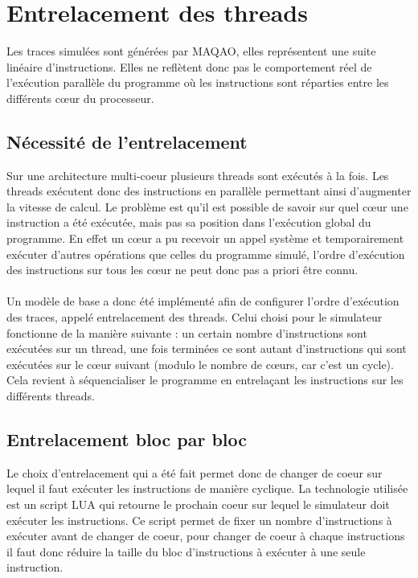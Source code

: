 \section{Entrelacement des threads}

Les traces simulées sont générées par \textsf{MAQAO}, elles représentent une suite linéaire d'instructions. Elles ne reflètent donc pas le comportement réel de l'exécution parallèle du programme où les instructions sont réparties entre les différents c\oe ur du processeur. 

\subsection{Nécessité de l'entrelacement}

Sur une architecture multi-coeur plusieurs threads sont exécutés à la fois. Les threads exécutent donc des instructions en parallèle permettant ainsi d'augmenter la vitesse de calcul. Le problème est qu'il est possible de savoir sur quel c\oe ur une instruction a été exécutée, mais pas sa position dans l'exécution global du programme. En effet un c\oe ur a pu recevoir un appel système et temporairement exécuter d'autres opérations que celles du programme simulé, l'ordre d'exécution des instructions sur tous les c\oe ur ne peut donc pas a priori être connu. 

\paragraph{}
Un modèle de base a donc été implémenté afin de configurer l'ordre d'exécution des traces, appelé entrelacement des threads. Celui choisi pour le simulateur fonctionne de la manière suivante : un certain nombre d'instructions sont exécutées sur un thread, une fois terminées ce sont autant d'instructions qui sont exécutées sur le c\oe ur suivant (modulo le nombre de c\oe urs, car c'est un cycle). Cela revient à séquencialiser le programme en entrelaçant les instructions sur les différents threads.

\subsection{Entrelacement bloc par bloc}

Le choix d'entrelacement qui a été fait permet donc de changer de coeur sur lequel il faut exécuter les instructions de manière cyclique. La technologie utilisée est un script LUA qui retourne le prochain coeur sur lequel le simulateur doit exécuter les instructions. Ce script permet de fixer un nombre d'instructions à exécuter avant de changer de coeur, pour changer de coeur à chaque instructions il faut donc réduire la taille du bloc d'instructions à exécuter à une seule instruction.\\

